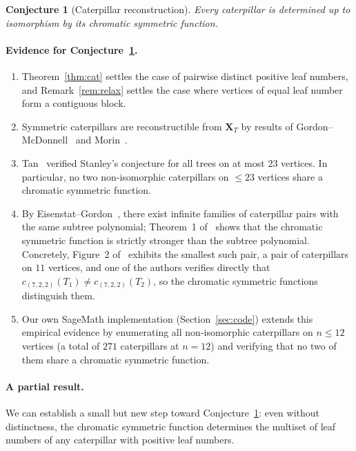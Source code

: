 \documentclass[11pt]{article}
\newtheorem{conjecture}[theorem]{Conjecture}
\theoremstyle{definition}
\newcommand{\X}{\mathbf{X}}
\begin{document}
\begin{conjecture}[Caterpillar reconstruction]\label{conj:cat}
Every caterpillar is determined up to isomorphism by its chromatic
symmetric function.
\end{conjecture}

\paragraph{Evidence for Conjecture~\ref{conj:cat}.}
\begin{enumerate}
\item Theorem~\ref{thm:cat} settles the case of pairwise distinct
      positive leaf numbers, and Remark~\ref{rem:relax} settles the
      case where vertices of equal leaf number form a contiguous block.
\item Symmetric caterpillars are reconstructible from $\X_T$ by results
      of Gordon--McDonnell~\cite{GordonMcDonnell} and
      Morin~\cite[Thm.~4.3.1]{Morin}.
\item Tan~\cite{Tan} verified Stanley's conjecture for all trees on
      at most $23$ vertices.  In particular, no two non-isomorphic
      caterpillars on $\leq 23$ vertices share a chromatic symmetric
      function.
\item By Eisenstat--Gordon~\cite{EisenstatGordon}, there exist infinite
      families of caterpillar pairs with the same subtree polynomial;
      Theorem~1 of~\cite{MMW} shows that the chromatic symmetric
      function is strictly stronger than the subtree polynomial.
      Concretely, Figure~2 of~\cite{MMW} exhibits the smallest such
      pair, a pair of caterpillars on $11$ vertices, and one of the
      authors verifies directly that
      $c_{(7,2,2)}(T_1)\neq c_{(7,2,2)}(T_2)$, so the chromatic
      symmetric functions distinguish them.
\item Our own SageMath implementation (Section~\ref{sec:code}) extends
      this empirical evidence by enumerating all non-isomorphic
      caterpillars on $n\leq 12$ vertices (a total of $271$
      caterpillars at $n=12$) and verifying that no two of them share
      a chromatic symmetric function.
\end{enumerate}

\paragraph{A partial result.}
We can establish a small but new step toward
Conjecture~\ref{conj:cat}: even without distinctness, the chromatic
symmetric function determines the multiset of leaf numbers of any
caterpillar with positive leaf numbers.
\end{document}
